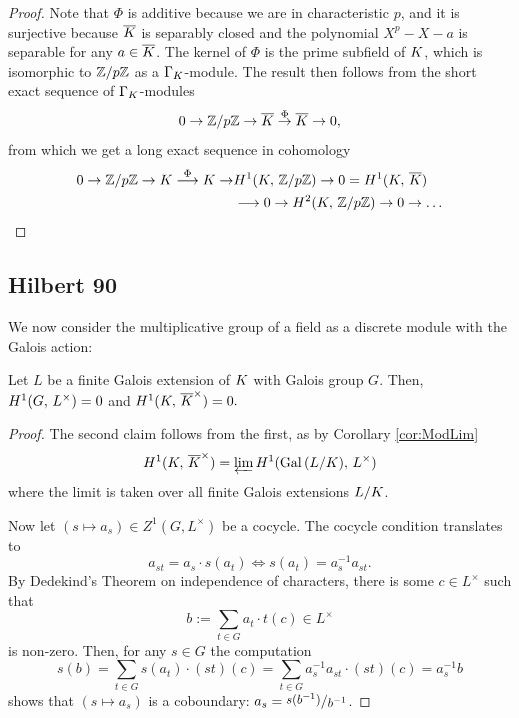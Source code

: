 \documentclass[a4paper, oneside]{memoir}
\begin{document}
\begin{proof}
	Note that $\Phi$ is additive because we are in characteristic $p$, and it is surjective because $\overline{K}$ is separably closed and the polynomial $X^p-X-a$ is separable for any $a\in\overline{K}$. The kernel of $\Phi$ is the prime subfield of $K$, which is isomorphic to $\mathbb{Z}/{p\mathbb{Z}}$ as a $\Gamma_K$-module. The result then follows from the short exact sequence of $\Gamma_K$-modules
	\[
		0\to \mathbb{Z}/{p\mathbb{Z}}\to \overline{K}\overset{\Phi}{\to} \overline{K}\to 0,
	\]
	from which we get a long exact sequence in cohomology
	\[
		\begin{aligned}
			0\to \mathbb{Z}/p\mathbb{Z} \to K \overset{\Phi}{\longrightarrow}K\to & H^{1}( K, \, \mathbb{Z}/p\mathbb{Z} )\to 0=H^{1}( K, \, \overline{K} )                \\
			                                                        & \longrightarrow 0\to H^{2}( K, \, \mathbb{Z}/p\mathbb{Z} )\to 0\to\ldots
		\end{aligned}
	\]
\end{proof}

\subsection{Hilbert 90}

We now consider the multiplicative group of a field as a discrete module with the Galois action:

\begin{theorem}[Hilbert 90]
	Let $L$ be a finite Galois extension of $K$ with Galois group $G$. Then, $H^{1}( G, \, L^\times )=0$ and $H^{1}( K, \, \overline{K}^\times ) = 0.$
\end{theorem}

\begin{proof}
	The second claim follows from the first, as by Corollary \ref{cor:ModLim}
	\[
		H^{1}( K, \, \overline{K}^\times )=\varprojlim{H^{1}( \operatorname{Gal}{(L/K)}, \, L^\times )}
	\]
	where the limit is taken over all finite Galois extensions $L/K$.

	Now let $(s\mapsto a_s)\in Z^1(G,L^\times)$ be a cocycle. The cocycle condition translates to
	\[
		a_{st}=a_s\cdot s(a_t) \iff s(a_t)=a_s^{-1} a_{st}.
	\]
	By Dedekind's Theorem on independence of characters, there is some $c\in L^\times$ such that
	\[
		b:=\sum_{t\in G}{a_t\cdot t(c)}\in L^\times
	\]
	is non-zero. Then, for any $s\in G$ the computation
	\[
		s(b)=\sum_{t\in G}{s(a_t)\cdot(st)(c)}=\sum_{t\in G}{a_s^{-1}a_{st}\cdot (st)(c)}=a_s^{-1}b
	\]
	shows that $(s\mapsto a_s)$ is a coboundary: $a_s=\sfrac{s(b^{-1})}{b^{-1}}$.
\end{proof}
\end{document}
